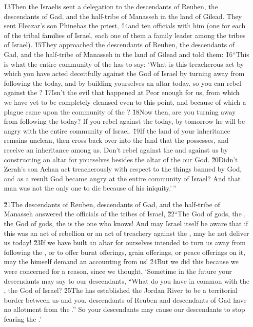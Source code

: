 \v{13}Then the Israelis sent a delegation to the descendants of Reuben, the descendants of Gad, and the half-tribe of Manasseh in the land of Gilead. They sent Eleazar's son Phinehas the priest, \v{14}and ten officials with him (one for each of the tribal families of Israel, each one of them a family leader among the tribes of Israel). \v{15}They approached the descendants of Reuben, the descendants of Gad, and the half-tribe of Manasseh in the land of Gilead and told them: \v{16}``This is what the entire community of the  has to say: `What is this treacherous act by which you have acted deceitfully against the God of Israel by turning away from following the  today, and by building yourselves an altar today, so you can rebel against the ? \v{17}Isn't the evil that happened at Peor enough for us, from which we have yet to be completely cleansed even to this point, and because of which a plague came upon the community of the ? \v{18}Now then, are you turning away from following the  today? If you rebel against the  today, by tomorrow he will be angry with the entire community of Israel. \v{19}If the land of your inheritance remains unclean, then cross back over into the land that the  possesses, and receive an inheritance among us. Don't rebel against the  and against us by constructing an altar for yourselves besides the altar of the  our God. \v{20}Didn't Zerah's son Achan act treacherously with respect to the things banned by God, and as a result God became angry at the entire community of Israel? And that man was not the only one to die because of his iniquity.'\,''

\v{21}The descendants of Reuben, descendants of Gad, and the half-tribe of Manasseh answered the officials of the tribes of Israel, \v{22}``The God of gods, the , the God of gods, the  is the one who knows! And may Israel itself be aware that if this was an act of rebellion or an act of treachery against the , may he not deliver us today! \v{23}If we have built an altar for ourselves intended to turn us away from following the , or to offer burnt offerings, grain offerings, or peace offerings on it, may the  himself demand an accounting from us! \v{24}But we did this because we were concerned for a reason, since we thought, `Sometime in the future your descendants may say to our descendants, ``What do you have in common with the , the God of Israel? \v{25}The  has established the Jordan River to be a territorial border between us and you. descendants of Reuben and descendants of Gad have no allotment from the .'' So your descendants may cause our descendants to stop fearing the .'


